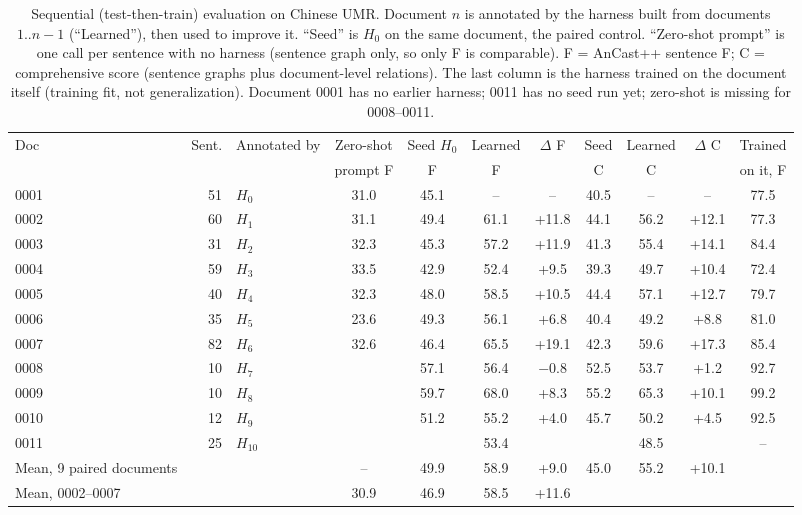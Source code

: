 \begin{table}[t]
\centering\small
\setlength{\tabcolsep}{3.6pt}
\begin{tabular}{@{}lrlcccccccc@{}}
\toprule
Doc & Sent. & Annotated by & Zero-shot & Seed $H_0$ & Learned & $\Delta$ F & Seed & Learned & $\Delta$ C & Trained \\
 & & & prompt F & F & F & & C & C & & on it, F \\
\midrule
0001 & 51 & $H_{0}$ & 31.0 & 45.1 & -- & -- & 40.5 & -- & -- & 77.5 \\
0002 & 60 & $H_{1}$ & 31.1 & 49.4 & 61.1 & +11.8 & 44.1 & 56.2 & +12.1 & 77.3 \\
0003 & 31 & $H_{2}$ & 32.3 & 45.3 & 57.2 & +11.9 & 41.3 & 55.4 & +14.1 & 84.4 \\
0004 & 59 & $H_{3}$ & 33.5 & 42.9 & 52.4 & +9.5 & 39.3 & 49.7 & +10.4 & 72.4 \\
0005 & 40 & $H_{4}$ & 32.3 & 48.0 & 58.5 & +10.5 & 44.4 & 57.1 & +12.7 & 79.7 \\
0006 & 35 & $H_{5}$ & 23.6 & 49.3 & 56.1 & +6.8 & 40.4 & 49.2 & +8.8 & 81.0 \\
0007 & 82 & $H_{6}$ & 32.6 & 46.4 & 65.5 & +19.1 & 42.3 & 59.6 & +17.3 & 85.4 \\
0008 & 10 & $H_{7}$ & \gapcell{} & 57.1 & 56.4 & $-$0.8 & 52.5 & 53.7 & +1.2 & 92.7 \\
0009 & 10 & $H_{8}$ & \gapcell{} & 59.7 & 68.0 & +8.3 & 55.2 & 65.3 & +10.1 & 99.2 \\
0010 & 12 & $H_{9}$ & \gapcell{} & 51.2 & 55.2 & +4.0 & 45.7 & 50.2 & +4.5 & 92.5 \\
0011 & 25 & $H_{10}$ & \gapcell{} & \gapcell{} & 53.4 & \gapcell{} & \gapcell{} & 48.5 & \gapcell{} & -- \\
\midrule
Mean, 9 paired documents & & & -- & 49.9 & 58.9 & +9.0 & 45.0 & 55.2 & +10.1 & \\
Mean, 0002--0007 & & & 30.9 & 46.9 & 58.5 & +11.6 & & & & \\
\bottomrule
\end{tabular}
\caption{Sequential (test-then-train) evaluation on Chinese UMR. Document $n$ is annotated by the harness built from documents $1..n{-}1$ (``Learned''), then used to improve it. ``Seed'' is $H_0$ on the same document, the paired control. ``Zero-shot prompt'' is one call per sentence with no harness (sentence graph only, so only F is comparable). F = AnCast++ sentence F; C = comprehensive score (sentence graphs plus document-level relations). The last column is the harness trained on the document itself (training fit, not generalization). Document 0001 has no earlier harness; 0011 has no seed run yet; zero-shot is missing for 0008--0011.}
\label{tab:prequential}
\end{table}
